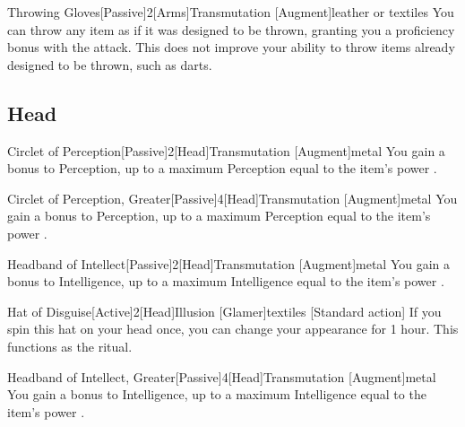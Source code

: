 \begin{magicitemdef}{Throwing Gloves}[Passive]{2}[Arms]{Transmutation [Augment]}{leather or textiles}
     You can throw any item as if it was designed to be thrown, granting you a  proficiency bonus with the attack.
    This does not improve your ability to throw items already designed to be thrown, such as darts.
\end{magicitemdef}

\subsection{Head}

\begin{magicitemdef}{Circlet of Perception}[Passive]{2}[Head]{Transmutation [Augment]}{metal}
     You gain a  bonus to Perception, up to a maximum Perception equal to the item's power .
\end{magicitemdef}

\begin{magicitemdef}{Circlet of Perception, Greater}[Passive]{4}[Head]{Transmutation [Augment]}{metal}
     You gain a  bonus to Perception, up to a maximum Perception equal to the item's power .
\end{magicitemdef}

\begin{magicitemdef}{Headband of Intellect}[Passive]{2}[Head]{Transmutation [Augment]}{metal}
     You gain a  bonus to Intelligence, up to a maximum Intelligence equal to the item's power .
\end{magicitemdef}

\begin{magicitemdef}{Hat of Disguise}[Active]{2}[Head]{Illusion [Glamer]}{textiles}
    [Standard action] If you spin this hat on your head once, you can change your appearance for 1 hour.
    This functions as the  ritual.
\end{magicitemdef}

\begin{magicitemdef}{Headband of Intellect, Greater}[Passive]{4}[Head]{Transmutation [Augment]}{metal}
     You gain a  bonus to Intelligence, up to a maximum Intelligence equal to the item's power .
\end{magicitemdef}

